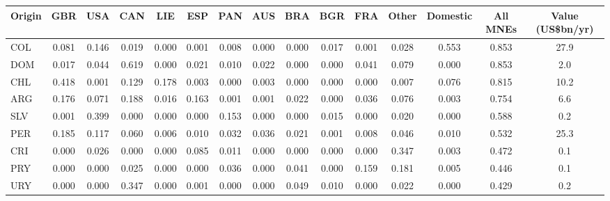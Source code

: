 \begin{tabular}{lcccccccccccccc}
\toprule
Origin & GBR & USA & CAN & LIE & ESP & PAN & AUS & BRA & BGR & FRA & Other & Domestic & All MNEs & Value (US\$bn/yr) \\
\midrule
COL & 0.081 & 0.146 & 0.019 & 0.000 & 0.001 & 0.008 & 0.000 & 0.000 & 0.017 & 0.001 & 0.028 & 0.553 & 0.853 & 27.9 \\
DOM & 0.017 & 0.044 & 0.619 & 0.000 & 0.021 & 0.010 & 0.022 & 0.000 & 0.000 & 0.041 & 0.079 & 0.000 & 0.853 & 2.0 \\
CHL & 0.418 & 0.001 & 0.129 & 0.178 & 0.003 & 0.000 & 0.003 & 0.000 & 0.000 & 0.000 & 0.007 & 0.076 & 0.815 & 10.2 \\
ARG & 0.176 & 0.071 & 0.188 & 0.016 & 0.163 & 0.001 & 0.001 & 0.022 & 0.000 & 0.036 & 0.076 & 0.003 & 0.754 & 6.6 \\
SLV & 0.001 & 0.399 & 0.000 & 0.000 & 0.000 & 0.153 & 0.000 & 0.000 & 0.015 & 0.000 & 0.020 & 0.000 & 0.588 & 0.2 \\
PER & 0.185 & 0.117 & 0.060 & 0.006 & 0.010 & 0.032 & 0.036 & 0.021 & 0.001 & 0.008 & 0.046 & 0.010 & 0.532 & 25.3 \\
CRI & 0.000 & 0.026 & 0.000 & 0.000 & 0.085 & 0.011 & 0.000 & 0.000 & 0.000 & 0.000 & 0.347 & 0.003 & 0.472 & 0.1 \\
PRY & 0.000 & 0.000 & 0.025 & 0.000 & 0.000 & 0.036 & 0.000 & 0.041 & 0.000 & 0.159 & 0.181 & 0.005 & 0.446 & 0.1 \\
URY & 0.000 & 0.000 & 0.347 & 0.000 & 0.001 & 0.000 & 0.000 & 0.049 & 0.010 & 0.000 & 0.022 & 0.000 & 0.429 & 0.2 \\
\bottomrule
\end{tabular}
